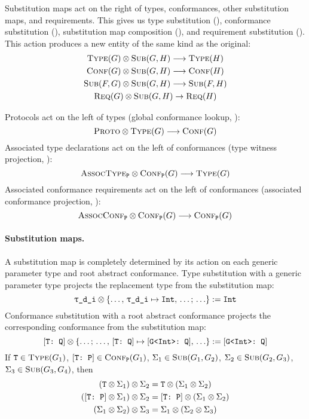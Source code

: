 \documentclass[../generics]{subfiles}
\begin{document}
Substitution maps act on the right of types, conformances, other substitution maps, and requirements. This gives us type substitution (), conformance substitution (), substitution map composition (), and requirement substitution (). This action produces a new entity of the same kind as the original:
\begin{gather*}
\textsc{Type}({G})\otimes\textsc{Sub}({G, H})\longrightarrow\textsc{Type}({H})\\
\textsc{Conf}({G})\otimes\textsc{Sub}({G, H})\longrightarrow\textsc{Conf}({H})\\
\textsc{Sub}({F, G})\otimes\textsc{Sub}({G, H})\longrightarrow\textsc{Sub}({F, H})\\
\textsc{Req}({G})\otimes\textsc{Sub}({G, H})\rightarrow\textsc{Req}({H})
\end{gather*}

Protocols act on the left of types (global conformance lookup, ):
\[\textsc{Proto}\otimes\textsc{Type}({G})\longrightarrow\textsc{Conf}({G})\]
Associated type declarations act on the left of conformances (type witness projection, ):
\[\textsc{AssocType}_{\texttt{P}}\otimes\textsc{Conf}_{\texttt{P}}({G})\longrightarrow\textsc{Type}({G})\]
Associated conformance requirements act on the left of conformances (associated conformance projection, ):
\[\textsc{AssocConf}_{\texttt{P}}\otimes\textsc{Conf}_{\texttt{P}}({G})\longrightarrow\textsc{Conf}_{\texttt{P}}({G})\]

\paragraph{Substitution maps.}
A substitution map is completely determined by its action on each generic parameter type and root abstract conformance. Type substitution with a generic parameter type projects the replacement type from the substitution map:
\[\ttgp{d}{i} \otimes \SubstMapC{\ldots,\,\SubstType{\ttgp{d}{i}}{Int},\,\ldots}{\ldots} := \texttt{Int}\]
Conformance substitution with a root abstract conformance projects the corresponding conformance from the substitution map:
\[
[\texttt{T:~Q}] \otimes \{\ldots;\,\ldots,\,[\texttt{T:~Q}] \mapsto [\texttt{G<Int>:~Q}],\,\ldots\} := [\texttt{G<Int>:~Q}]
\]
If $\texttt{T}\in\textsc{Type}({G_1})$, $[\texttt{T:~P}]\in\textsc{Conf}_{\texttt{P}}({G_1})$, $\Sigma_1\in\textsc{Sub}({G_1, G_2})$, $\Sigma_2\in\textsc{Sub}({G_2, G_3})$, $\Sigma_3\in\textsc{Sub}({G_3, G_4})$, then 
\begin{gather*}
(\texttt{T}\otimes \Sigma_1) \otimes \Sigma_2=\texttt{T}\otimes (\Sigma_1\otimes \Sigma_2)\\
([\texttt{T:~P}]\otimes \Sigma_1) \otimes \Sigma_2=[\texttt{T:~P}]\otimes (\Sigma_1\otimes \Sigma_2)\\
(\Sigma_1\otimes \Sigma_2) \otimes \Sigma_3=\Sigma_1\otimes(\Sigma_2\otimes \Sigma_3)
\end{gather*}
\end{document}

